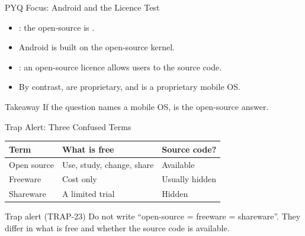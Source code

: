 \documentclass[aspectratio=169]{beamer}
\begin{document}
\begin{frame}{PYQ Focus: Android and the Licence Test}
  \begin{itemize}
    \item {}: the open-source  is
      .
    \item Android is built on the open-source  kernel.
    \item {}: an open-source licence allows users to  the source code.
    \item By contrast,  are
      proprietary, and  is a proprietary mobile OS.
  \end{itemize}
  \begin{alertblock}{Takeaway}
    If the question names a mobile OS,  is the open-source answer.
  \end{alertblock}
\end{frame}

\begin{frame}{Trap Alert: Three Confused Terms}
  \begin{center}
    \begin{tabular}{p{}p{}p{}}
      \toprule
      \textbf{Term} & \textbf{What is free} & \textbf{Source code?} \\
      \midrule
      Open source & Use, study, change, share & Available \\
      Freeware & Cost only & Usually hidden \\
      Shareware & A limited trial & Hidden \\
      \bottomrule
    \end{tabular}
  \end{center}
  \vspace{0.2cm}
  \begin{alertblock}{Trap alert (TRAP-23)}
    Do not write ``open-source = freeware = shareware''. They differ in what is
    free and whether the source code is available.
  \end{alertblock}
\end{frame}
\end{document}
